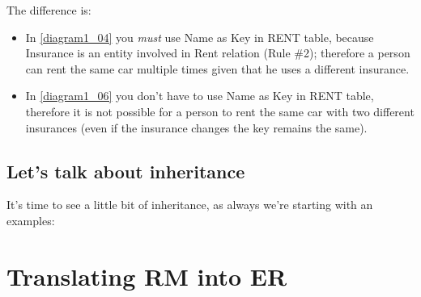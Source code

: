\documentclass[class=book, crop=false, oneside]{standalone}
\begin{document}
The difference is:
\begin{itemize}
	\item In \ref{diagram1_04} you \emph{must} use Name as Key in RENT table, because Insurance is an entity involved in Rent relation (Rule \#2); therefore a person can rent the same car multiple times given that he uses a different insurance.\\
	\item In \ref{diagram1_06} you don't have to use Name as Key in RENT table, therefore it is not possible for a person to rent the same car with two different insurances (even if the insurance changes the key remains the same).
\end{itemize}

\section{Let's talk about inheritance}
It's time to see a little bit of inheritance, as always we're starting with an examples:

\chapter{Translating RM into ER}
\end{document}
